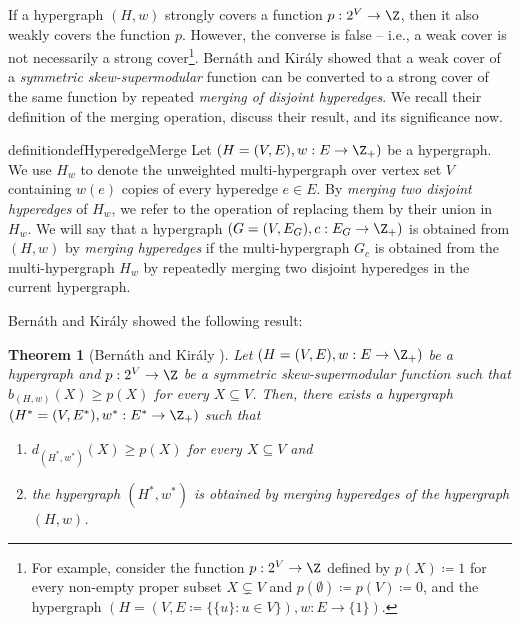 \documentclass{article}
\newtheorem{theorem}{Theorem}[section]
\begin{document}
If a hypergraph $(H, w)$ strongly covers a function $p:2^V\rightarrow \Z$, then it also weakly covers the function $p$. However, the converse is false -- i.e., a weak cover is not necessarily a strong cover\footnote{For example, consider the function $p: 2^V\rightarrow \Z$ defined by $p(X)\coloneqq 1$ for every non-empty proper subset $X\subsetneq V$ and $p(\emptyset)\coloneqq p(V)\coloneqq 0$, and the hypergraph $(H=(V, E\coloneqq \{\{u\}: u\in V\}), w: E\rightarrow \{1\})$.}.  
Bern\'{a}th and Kir\'{a}ly \cite{Bernath-Kiraly} showed 
that a weak cover of a \emph{symmetric skew-supermodular} function can be converted to a strong cover of the same function by repeated \emph{merging of disjoint hyperedges}. 
We recall their definition of the merging operation, discuss their result, and its significance now. 
\begin{restatable}{definition}{defHyperedgeMerge}\label{def:WeakToStrongCover:hyperedge-merge}
Let $(H=(V, E), w: E\rightarrow \Z_+)$ be a hypergraph. 
We use $H_w$ to denote the unweighted multi-hypergraph over vertex set $V$ containing $w(e)$ copies of every hyperedge $e\in E$.  
By \emph{merging two disjoint hyperedges} of $H_w$, we refer to the operation of replacing them by their union in $H_w$. 
We will say that a hypergraph $(G=(V, E_G), c: E_G\rightarrow \Z_+)$ is obtained from $(H, w)$ by \emph{merging hyperedges} if the multi-hypergraph $G_c$ is obtained from the multi-hypergraph $H_w$ by repeatedly merging two disjoint hyperedges in the current hypergraph. 
\end{restatable}
Bern\'{a}th and Kir\'{a}ly showed the following result: 
\begin{theorem}[Bern\'{a}th and Kir\'{a}ly \cite{Bernath-Kiraly}]\label{thm:bernath-kiraly}
    Let $(H=(V, E), w: E\rightarrow \Z_+)$ be a hypergraph and $p:2^V\rightarrow \Z$ be a symmetric skew-supermodular function such that 
$b_{(H, w)}(X) \geq p(X)$ for every $X \subseteq V$. 
Then, there exists a hypergraph $\left(H^* = (V, E^*), w^*:E^* \rightarrow\Z_+\right)$ 
such that
\begin{enumerate}[label=$(\arabic*)$]
    \item $d_{(H^*, w^*)}(X) \geq p(X)$ for every $X\subseteq V$ and 
    \item the hypergraph $(H^*,w^*)$ is obtained by merging hyperedges of the hypergraph $(H, w)$.
\end{enumerate}
\end{theorem}
\end{document}
